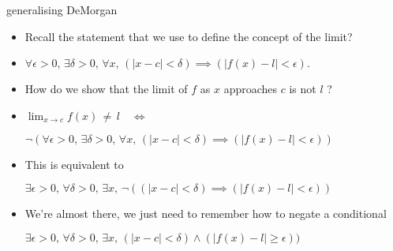 \documentclass[landscape]{beamer}
\begin{document}
\begin{frame}{generalising DeMorgan}
\begin{itemize}
\item Recall the statement that we use to define the concept of the limit? \pause
\item \rule[-6pt]{0pt}{24pt} $ \forall \epsilon>0, \, \exists \delta>0, \, \forall x, \, (|x-c| < \delta) \implies (|f(x)-l| < \epsilon).$ \pause
\item How do we show that the limit of $f$ as $x$ approaches $c$ is not $l$ ? \pause
\item \rule[-6pt]{0pt}{24pt} $ \lim_{x\rightarrow c} f(x) \, \neq \, l \quad \iff $ \pause
\rule[-6pt]{0pt}{24pt} $ \lnot ( \forall \epsilon>0, \, \exists \delta>0, \, \forall x, \, (|x-c| < \delta) \implies (|f(x)-l| < \epsilon) )$ \pause
\item This is equivalent to \newline
\rule[-6pt]{0pt}{24pt} $ \exists \epsilon>0, \, \forall \delta>0, \, \exists x, \,  \lnot ( (|x-c| < \delta) \implies (|f(x)-l| < \epsilon) )$ \pause
\item We're almost there, we just need to remember how to negate a conditional\textellipsis \pause \newline
\rule[-6pt]{0pt}{24pt} $ \exists \epsilon>0, \, \forall \delta>0, \, \exists x, \,   (|x-c| < \delta ) \land (|f(x)-l| \geq \epsilon) )$
\end{itemize}
\end{frame}
\end{document}
